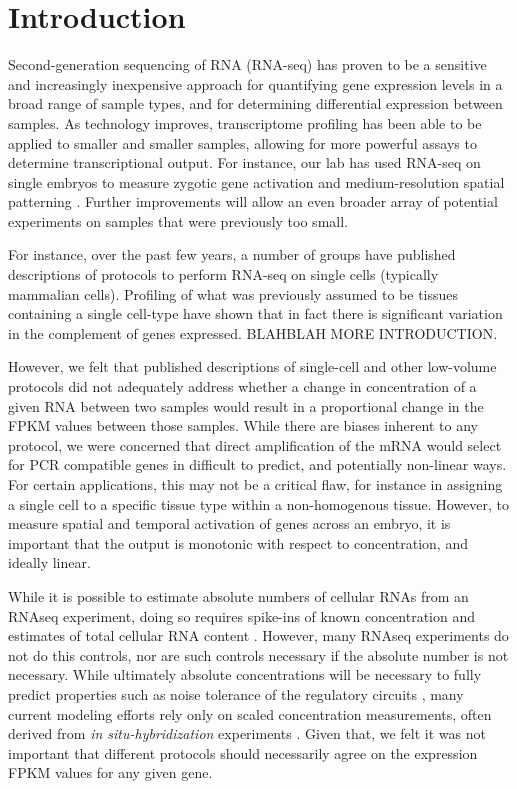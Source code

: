 \section{Introduction}
Second-generation sequencing of RNA (RNA-seq) has proven to be a sensitive and increasingly inexpensive approach for quantifying gene expression levels in a broad range of sample types, and for determining differential expression between samples.  As technology improves, transcriptome profiling has been able to be applied to smaller and smaller samples, allowing for more powerful assays to determine transcriptional output.  For instance, our lab has used RNA-seq on single embryos to measure zygotic gene activation \cite{Lott:2011cc} and medium-resolution spatial patterning \cite{Combs:2013jy}.  Further improvements will allow an even broader array of potential experiments on samples that were previously too small.

For instance, over the past few years, a number of groups have published descriptions of protocols to perform RNA-seq on single cells (typically mammalian cells). Profiling of what was previously assumed to be tissues containing a single cell-type have shown that in fact there is significant variation in the complement of genes expressed. BLAHBLAH MORE INTRODUCTION. 

However, we felt that published descriptions of single-cell and other low-volume protocols did not adequately address whether a change in concentration of a given RNA between two samples would result in a proportional change in the FPKM values between those samples. While there are biases inherent to any protocol, we were concerned that direct amplification of the mRNA would select for PCR compatible genes in difficult to predict, and potentially non-linear ways.  For certain applications, this may not be a critical flaw, for instance in assigning a single cell to a specific tissue type within a non-homogenous tissue.  However, to measure spatial and temporal activation of genes across an embryo, it is important that the output is monotonic with respect to concentration, and ideally linear.


While it is possible to estimate absolute numbers of cellular RNAs from an RNAseq experiment, doing so requires spike-ins of known concentration and estimates of total cellular RNA content \cite{Mortazavi:2008jj}. However, many RNAseq experiments do not do this controls, nor are such controls necessary if the absolute number is not necessary. While ultimately absolute concentrations will be necessary to fully predict properties such as noise tolerance of the regulatory circuits \cite{Gregor:2007du,Gregor:2005jn}, many current modeling efforts rely only on scaled concentration measurements, often derived from {\em in situ-hybridization} experiments \cite{Garcia:2013fs,Ilsley:2013fk,He:2010ix}.  Given that, we felt it was not important that different protocols should necessarily agree on the expression FPKM values for any given gene.

